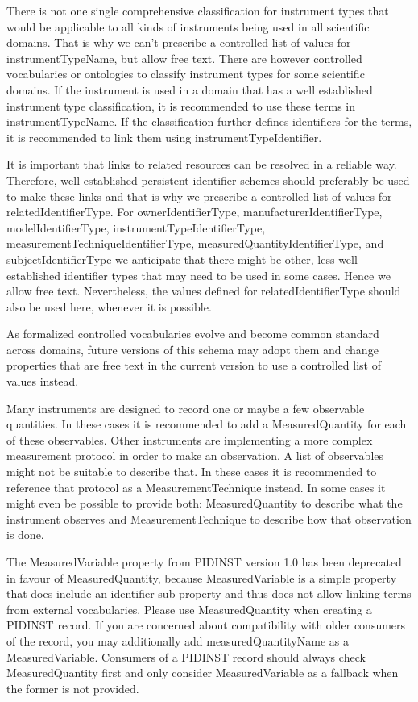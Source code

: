 \documentclass[titlepage=true,twoside=false,DIV=13]{scrartcl}
\begin{document}
There is not one single comprehensive classification for instrument
types that would be applicable to all kinds of instruments being used
in all scientific domains.  That is why we can't prescribe a
controlled list of values for instrumentTypeName, but allow free text.
There are however controlled vocabularies or ontologies to classify
instrument types for some scientific domains.  If the instrument is
used in a domain that has a well established instrument type
classification, it is recommended to use these terms in
instrumentTypeName.  If the classification further defines identifiers
for the terms, it is recommended to link them using
instrumentTypeIdentifier.

It is important that links to related resources can be resolved in a
reliable way.  Therefore, well established persistent identifier
schemes should preferably be used to make these links and that is why
we prescribe a controlled list of values for relatedIdentifierType.
For ownerIdentifierType, manufacturerIdentifierType,
modelIdentifierType, instrumentTypeIdentifierType,
measurementTechniqueIdentifierType, measuredQuantityIdentifierType,
and subjectIdentifierType we anticipate that there might be other,
less well established identifier types that may need to be used in
some cases.  Hence we allow free text.  Nevertheless, the values
defined for relatedIdentifierType should also be used here, whenever
it is possible.

As formalized controlled vocabularies evolve and become common
standard across domains, future versions of this schema may adopt them
and change properties that are free text in the current version to use
a controlled list of values instead.

Many instruments are designed to record one or maybe a few observable
quantities.  In these cases it is recommended to add a
MeasuredQuantity for each of these observables.  Other instruments are
implementing a more complex measurement protocol in order to make an
observation.  A list of observables might not be suitable to describe
that.  In these cases it is recommended to reference that protocol as
a MeasurementTechnique instead.  In some cases it might even be
possible to provide both: MeasuredQuantity to describe what the
instrument observes and MeasurementTechnique to describe how that
observation is done.

The MeasuredVariable property from PIDINST version 1.0 has been
deprecated in favour of MeasuredQuantity, because MeasuredVariable is
a simple property that does include an identifier sub-property and
thus does not allow linking terms from external vocabularies.  Please
use MeasuredQuantity when creating a PIDINST record.  If you are
concerned about compatibility with older consumers of the record, you
may additionally add measuredQuantityName as a MeasuredVariable.
Consumers of a PIDINST record should always check MeasuredQuantity
first and only consider MeasuredVariable as a fallback when the former
is not provided.
\end{document}
